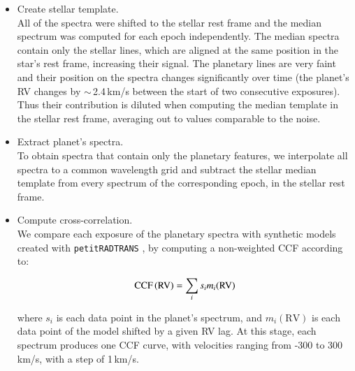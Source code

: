 \documentclass{aa}
\begin{document}
\begin{itemize}
    \item Create stellar template.\\
    All of the spectra were shifted to the stellar rest frame and the median spectrum was computed for each epoch independently. The median spectra contain only the stellar lines, which are aligned at the same position in the star's rest frame, increasing their signal. The planetary lines are very faint and their position on the spectra changes significantly over time (the planet's RV changes by $\sim$\,2.4\,km/s between the start of two consecutive exposures). Thus their contribution is diluted when computing the median template in the stellar rest frame, averaging out to values comparable to the noise.

    \item Extract planet's spectra.\\
    To obtain spectra that contain only the planetary features, we interpolate all spectra to a common wavelength grid and subtract the stellar median template from every spectrum of the corresponding epoch, in the stellar rest frame.

    \item Compute cross-correlation.\\
    We compare each exposure of the planetary spectra with synthetic models created with \texttt{petitRADTRANS} \citep[][see next section]{molliere2019, molliere2020, alei2022}, by computing a non-weighted CCF according to:

\begin{equation}
    \label{eq:ccf}
    \begin{centering}
        \mathrm{CCF\,(RV)} = \sum_i s_i m_{i}\mathrm{(RV)}
    \end{centering}
\end{equation}

    where $s_i$ is each data point in the planet's spectrum, and $m_{i}\mathrm{(RV)}$ is each data point of the model shifted by a given RV lag. At this stage, each spectrum produces one CCF curve, with velocities ranging from -300 to 300\,km/s, with a step of 1\,km/s.



\end{itemize}
\end{document}
